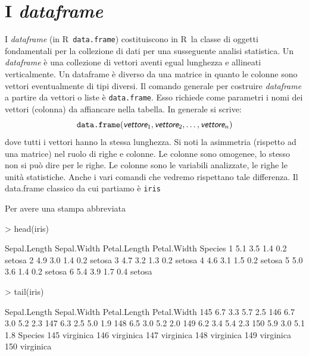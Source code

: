 \documentclass[onecolumn,12pt]{book}
\newcommand{\varia}[1]{\textsl{\textsf{#1}}}
\newcommand{\rpr}{\textsf{R}~}
\begin{document}
 \section{I \emph{dataframe}}

I \emph{dataframe} (in \rpr  \texttt{data.frame}) costituiscono in \rpr la classe di oggetti fondamentali per la collezione di dati per una susseguente analisi statistica.
Un \emph{dataframe}  \`e una collezione di vettori aventi egual lunghezza e allineati verticalmente. Un dataframe \`e diverso da una matrice in quanto le colonne sono vettori eventualmente di tipi diversi. Il comando generale per costruire \emph{dataframe} a partire da vettori o liste
\`e \texttt{data.frame}.  Esso richiede come parametri i nomi dei vettori (colonna) da affiancare nella tabella. In generale si scrive:
\begin{equation*}\texttt{data.frame}(\varia{vettore}_1,\varia{vettore}_2, \ldots, \varia{vettore}_n)\end{equation*}
dove tutti i vettori hanno la stessa lunghezza.
Si noti la asimmetria  (rispetto ad una matrice) nel ruolo di righe e colonne. Le colonne sono omogenee, lo stesso non si pu\`o dire per le righe. Le colonne sono le variabili analizzate, le righe le unit\`a statistiche. Anche i vari comandi che vedremo rispettano tale differenza.
Il data.frame classico da cui partiamo è \texttt{iris}

Per avere una stampa abbreviata

\begin{Schunk}
\begin{Sinput}
> head(iris)
\end{Sinput}
\begin{Soutput}
  Sepal.Length Sepal.Width Petal.Length Petal.Width Species
1          5.1         3.5          1.4         0.2  setosa
2          4.9         3.0          1.4         0.2  setosa
3          4.7         3.2          1.3         0.2  setosa
4          4.6         3.1          1.5         0.2  setosa
5          5.0         3.6          1.4         0.2  setosa
6          5.4         3.9          1.7         0.4  setosa
\end{Soutput}
\begin{Sinput}
> tail(iris)
\end{Sinput}
\begin{Soutput}
    Sepal.Length Sepal.Width Petal.Length Petal.Width
145          6.7         3.3          5.7         2.5
146          6.7         3.0          5.2         2.3
147          6.3         2.5          5.0         1.9
148          6.5         3.0          5.2         2.0
149          6.2         3.4          5.4         2.3
150          5.9         3.0          5.1         1.8
      Species
145 virginica
146 virginica
147 virginica
148 virginica
149 virginica
150 virginica
\end{Soutput}
\end{Schunk}
\end{document}
